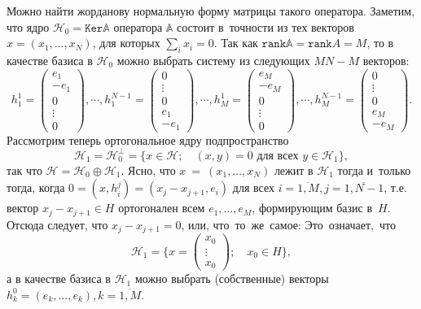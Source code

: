 \documentclass{article}
\begin{document}
Можно найти жорданову нормальную форму матрицы такого оператора.
Заметим, что ядро \( \mathcal{H}_0 = \mathtt{Ker} \mathbb{A} \) оператора \( \mathbb{A} \)
состоит в~точности из тех векторов \( x = ( x_1, \ldots, x_N ) \), для которых \( \sum_i x_i  = 0 \).
Так как \( \mathtt{rank}\mathbb{A} = \mathtt{rank} A = M \),
то в качестве базиса в \( \mathcal{H}_0 \) можно выбрать систему
из следующих \( MN - M \) векторов:
\[ h_1^1 = \begin{pmatrix} e_1 \\ -e_1 \\ 0 \\ \vdots \\ 0 \end{pmatrix}, \cdots,
    h_1^{N-1} = \begin{pmatrix} 0 \\ \vdots \\ 0 \\ e_1 \\ -e_1 \end{pmatrix}, \cdots,
    h_M^1 = \begin{pmatrix} e_M \\ -e_M \\ 0 \\ \vdots \\ 0 \end{pmatrix}, \cdots,
    h_M^{N-1} = \begin{pmatrix} 0 \\ \vdots \\ 0 \\ e_M \\ -e_M \end{pmatrix}. \]
Рассмотрим теперь ортогональное ядру подпространство
\[ \mathcal{H}_1 = \mathcal{H}_0^\perp = \{ x\in\mathcal{H};\quad (x,y)=0 \text{ для всех } y\in\mathcal{H}_1 \}, \]
так что \( \mathcal{H} = \mathcal{H}_0 \oplus \mathcal{H}_1 \).
Ясно, что \( x~=~(x_1,\ldots,x_N) \) лежит в \( \mathcal{H}_1 \) тогда и~только тогда, когда
\( 0 = (x, h_i^j) = (x_j - x_{j+1}, e_i) \) для всех \( i=\overline{1,M}, j=\overline{1,N-1} \),
т.е. вектор \( x_j - x_{j+1} \in H \) ортогонален всем \( e_1, \ldots, e_M \),
формирующим базис в~\( H \).
Отсюда следует, что  \( x_j - x_{j+1} = 0 \),
или, что~то~же~самое:
Это~означает,~что
\[ \mathcal{H}_1 = \{ %
    x = \begin{pmatrix} x_0 \\ \vdots \\ x_0 \end{pmatrix}; \quad
    x_0 \in H
    \}, \]
а в качестве базиса в \( \mathcal{H}_1 \) можно выбрать (собственные) векторы
\( h_k^0 = (e_k, \ldots, e_k), k=\overline{1,M} \).
\end{document}
